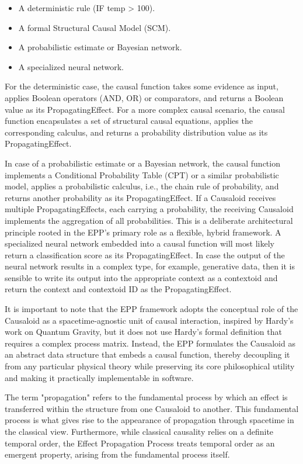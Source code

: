 \begin{itemize}
	\item A deterministic rule (IF temp > 100).
 	\item A formal Structural Causal Model (SCM).
	\item A probabilistic estimate or Bayesian network.
	\item A specialized neural network.
\end{itemize}

For the deterministic case, the causal function takes some evidence as input, applies Boolean operators (AND, OR) or comparators, and returns a Boolean value as its PropagatingEffect. For a more complex causal scenario, the causal function encapsulates a set of structural causal equations,
applies the corresponding calculus, and returns a probability distribution value as its PropagatingEffect.

In case of a probabilistic estimate or a Bayesian network, the causal function implements a Conditional Probability Table (CPT) or a similar probabilistic model, applies a probabilistic calculus, i.e., the chain rule of probability, and returns another probability as its PropagatingEffect. If a Causaloid receives multiple PropagatingEffects, each carrying a probability, the receiving Causaloid implements the aggregation of all probabilities. This is a deliberate architectural principle rooted in the EPP's primary role as a flexible, hybrid framework. A specialized neural network embedded into a causal function will most likely return a classification score as its PropagatingEffect. In case the output of the neural network results in a complex type, for example, generative data, then it is sensible to write its output into the appropriate context as a contextoid and return the context and contextoid ID as the PropagatingEffect. 


It is important to note that the EPP framework adopts the conceptual role of the Causaloid as a spacetime-agnostic unit of causal interaction, inspired by Hardy’s work on Quantum Gravity, but it does not use Hardy's formal definition that requires a complex process matrix.  Instead, the EPP formulates the Causaloid as an abstract data structure that embeds a causal function, thereby decoupling it from any particular physical theory while preserving its core philosophical utility and making it practically implementable in software.

The term "propagation" refers to the fundamental process by which an effect is transferred within the structure from one Causaloid to another. This fundamental process is what gives rise to the appearance of propagation through spacetime in the classical view. Furthermore, while classical causality relies on a definite temporal order, the Effect Propagation Process treats temporal order as an emergent property, arising from the fundamental process itself.

